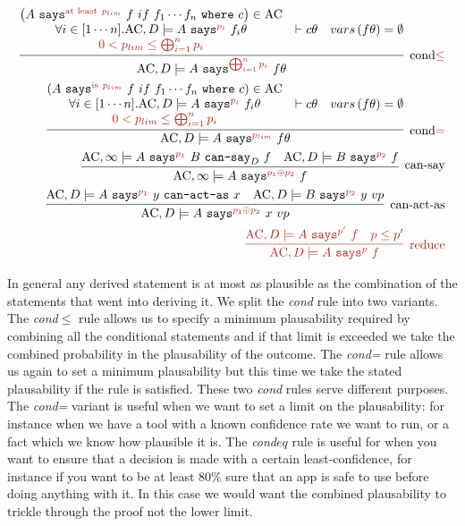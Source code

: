 \documentclass[a4paper]{article}
\newcommand{\new}[1]{{\color{BrickRed} #1}}
\newcommand{\ac}[0]{\ensuremath\text{AC}}
\newcommand{\secpalmath}[1]{\ensuremath\texttt{#1}}
\newcommand{\says}[1]{\secpalmath{says}^{\new{#1}}}
\newcommand{\canSay}[1]{\secpalmath{can-say}_{#1}}
\newcommand{\canActAs}[0]{\secpalmath{can-act-as}}
\newcommand{\where}[0]{\secpalmath{where}}
\begin{document}
{\footnotesize\centering
\begin{eqnarray}
  \infer[\text{cond\new{$\leq$}}]{
    \ac, D \models A~\says{\bigoplus_{i=1}^n p_i}~f\theta
  }{
    \begin{matrix}{
      \left(A~\says{\text{at least}~p_{lim}}~f~if~f_1\cdots f_n~\where~c\right) \in \ac
    }\\{
      \forall i \in [1\cdots n]. \ac, D \models A~\says{p_i}~f_i\theta
    }\\\new{
      0 < p_{lim} \leq \bigoplus_{i=1}^n p_i
    }
    \end{matrix}&
    \vdash c\theta &
    vars\left(f\theta\right) = \emptyset
  }
  \\
  \infer[\text{cond\new{=}}]{
    \ac, D \models A~\says{p_{lim}}~f\theta
  }{
    \begin{matrix}{
      \left(A~\says{\text{is}~p_{lim}}~f~if~f_1\cdots f_n~\where~c\right) \in \ac
    }\\{
      \forall i \in [1\cdots n]. \ac, D \models A~\says{p_i}~f_i\theta
    }\\\new{
      0 < p_{lim} \leq \bigoplus_{i=1}^n p_i
    }
    \end{matrix}&
    \vdash c\theta &
    vars\left(f\theta\right) = \emptyset
  }
  \\
  \infer[\text{can-say}]{
    \ac, \infty \models A~\says{p_1 \oplus p_2}~f
  }{
    \ac, \infty \models A~\says{p_1}~B~\canSay{D}~f &
    \ac, D \models B~\says{p_2}~f
  }
  \\
  \infer[\text{can-act-as}]{
    \ac, D \models A~\says{p_1 \oplus p_2}~x~vp
  }{
    \ac, D \models A~\says{p_1}~y~\canActAs~x &
    \ac, D \models B~\says{p_2}~y~vp
  }
  \\
  \new{
    \infer[\text{reduce}]{
        \ac, D \models A~\says{p}~f
    }{
        \ac, D \models A~\says{p^\prime}~f & p \leq p^\prime
    }
  }
\end{eqnarray}
}

In general any derived statement is at most as plausible as the combination of the statements that went into deriving it.  We split the \emph{cond} rule into two variants.  The \emph{cond$\leq$} rule allows us to specify a minimum plausability required by combining all the conditional statements and if that limit is exceeded we take the combined probability in the plausability of the outcome.
The \emph{cond=} rule allows us again to set a minimum plausability but this time we take the stated plausability if the rule is satisfied.  These two \emph{cond} rules serve different purposes.  The \emph{cond=} variant is useful when we want to set a limit on the plausability: for instance when we have a tool with a known confidence rate we want to run, or a fact which we know how plausible it is.  The \emph{cond$eq$} rule is useful for when you want to ensure that a decision is made with a certain least-confidence, for instance if you want to be at least 80\% sure that an app is safe to use before doing anything with it.  In this case we would want the combined plausability to trickle through the proof not the lower limit.
\end{document}
